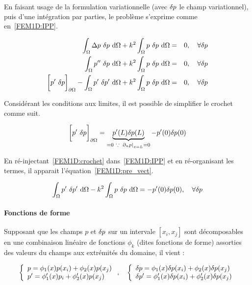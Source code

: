 En faisant usage de la formulation variationnelle (avec $\delta p$ le champ variationnel), puis d'une intégration par
parties, le problème s'exprime comme en~\eqref{FEM1D:IPP}.

\begin{eqnarray}
	\int_\Omega \Delta p~\delta p~\mathrm{d}\Omega + k^2 \int_\Omega p~\delta p~\mathrm{d}\Omega & =  & 0,\quad \forall\delta p\notag\\
	\int_\Omega p''~\delta p~\mathrm{d}\Omega + k^2 \int_\Omega p~\delta p~\mathrm{d}\Omega & =  & 0,\quad \forall\delta p\notag\\
	\bigg[p'~\delta p\bigg]_{\partial\Omega} - \int_\Omega p'~\delta p' ~\mathrm{d}\Omega + k^2\int_\Omega p~\delta p~\mathrm{d}\Omega & = & 0, \quad \forall\delta p \label{FEM1D:IPP}
\end{eqnarray}

Considérant les conditions aux limites, il est possible de simplifier le crochet comme suit.

\begin{equation}
	\bigg[p'~\delta p\bigg]_{\partial\Omega} = \underbrace{p'(L)\delta p(L)}_{=0~\because~\left.\partial_np\right|_{x=L}= 0} - p'(0)\delta p(0) \label{FEM1D:crochet}\\
\end{equation}

En ré-injectant~\eqref{FEM1D:crochet} dans~\eqref{FEM1D:IPP} et en ré-organisant les termes, il apparait l'équation~\ref{FEM1D:pre_vect}.

\begin{equation}
	\int_\Omega p'~\delta p'~\mathrm{d}\Omega - k^2\int_\Omega p~\delta p~\mathrm{d}\Omega = -p'(0)\delta p(0), \quad \forall\delta p \label{FEM1D:IPP}
\end{equation}

\paragraph{Fonctions de forme}

Supposant que les champs $p$ et $\delta p$ sur un intervale $[x_i, x_j]$ sont décomposables en une combinaison linéaire de
fonctions $\phi_k$ (dites fonctions de forme) assorties des valeurs du champs aux extrémités du domaine, il vient :

\begin{equation}
	\left\{\begin{array}{l}
		p = \phi_1(x)p(x_i) + \phi_2(x)p(x_j)\\
		p' = \phi_1'(x)p_i + \phi_2'(x)p(x_j)\\
	\end{array}\right., \quad
	\left\{\begin{array}{l}
		\delta p = \phi_1(x)\delta p(x_i) + \phi_2(x)\delta p(x_j)\\
		\delta p' = \phi_1'(x)\delta p(x_i) + \phi_2'(x)\delta p(x_j)\\
	\end{array}\right.\label{FEM1D:shapefun}
\end{equation}

